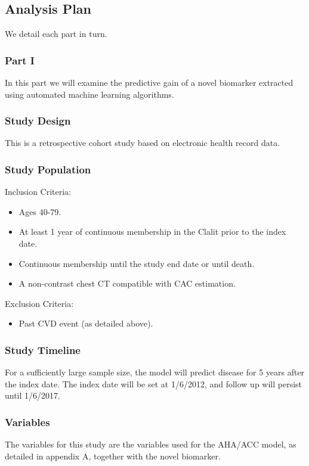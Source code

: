 \documentclass[a4paper,12pt]{article}
\begin{document}
	\subsection{Analysis Plan}
	We detail each part in turn.
	
		\subsubsection{Part I}
		In this part we will examine the predictive gain of a novel biomarker extracted using automated machine learning algorithms.
		
		\subsubsection*{Study Design}
		This is a retrospective cohort study based on electronic health record data.
		
		\subsubsection*{Study Population}
		Inclusion Criteria:
		\begin{itemize}
			\item Ages 40-79.
			\item At least 1 year of continuous membership in the Clalit prior to the index date.
			\item Continuous membership until the study end date or until death.
			\item A non-contrast chest CT compatible with CAC estimation.
		\end{itemize}
		
		Exclusion Criteria:
		\begin{itemize}
			\item Past CVD event (as detailed above).
		\end{itemize}
		
		\subsubsection*{Study Timeline}
		For a sufficiently large sample size, the model will predict disease for 5 years after the index date. The index date will be set at 1/6/2012, and follow up will persist until 1/6/2017.
		
		\subsubsection*{Variables}
		The variables for this study are the variables used for the AHA/ACC model, as detailed in appendix A, together with the novel biomarker.
		
\end{document}
